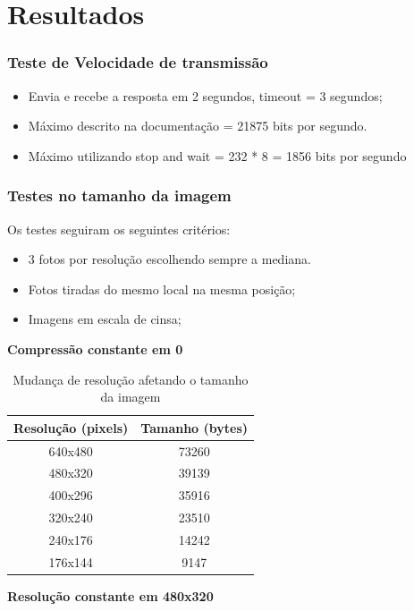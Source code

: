 \documentclass[12pt]{beamer}
\begin{document}
\section{Resultados}
\begin{frame}
    \frametitle{Teste de Velocidade de transmissão}
    \begin{itemize}
        \item Envia e recebe a resposta em 2 segundos, timeout = 3 segundos;
        \item Máximo descrito na documentação = 21875 bits por segundo.
        \item Máximo utilizando stop and wait = 232 * 8 = 1856 bits por segundo
    \end{itemize}
\end{frame}

\begin{frame}[allowframebreaks]
    \frametitle{Testes no tamanho da imagem}
    Os testes seguiram os seguintes critérios:
    \begin{itemize}
        \item 3 fotos por resolução escolhendo sempre a mediana.
        \item Fotos tiradas do mesmo local na mesma posição;
        \item Imagens em escala de cinsa;
    \end{itemize}
    \framebreak
    \textbf{Compressão constante em 0}
    \begin{table}[!h]
        \centering
        \begin{tabular}{@{}c|c@{}}
            \toprule
            Resolução (pixels) & Tamanho (bytes) \\ \midrule
            640x480            & 73260           \\
            480x320            & 39139           \\
            400x296            & 35916           \\
            320x240            & 23510           \\
            240x176            & 14242           \\
            176x144            & 9147            \\ \bottomrule
        \end{tabular}
        \caption{Mudança de resolução afetando o tamanho da imagem}
        \label{tab:resolution}
    \end{table}
    \framebreak
    \textbf{Resolução constante em 480x320}
    \begin{table}[!h]

\end{table}
\end{frame}
\end{document}
